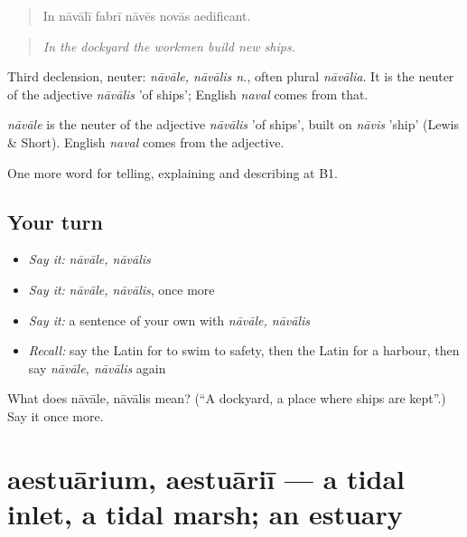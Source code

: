\begin{quote}
In nāvālī fabrī nāvēs novās aedificant.
\end{quote}

\begin{quote}
\emph{In the dockyard the workmen build new ships.}
\end{quote}

Third declension, neuter: \emph{nāvāle, nāvālis n.}, often plural \emph{nāvālia}. It is the neuter of the adjective \emph{nāvālis} 'of ships'; English \emph{naval} comes from that.

\begin{cousinweb}
\emph{nāvāle} is the neuter of the adjective \emph{nāvālis} 'of ships', built on \emph{nāvis} 'ship' (Lewis \& Short). English \emph{naval} comes from the adjective.
\end{cousinweb}

\begin{grammarlens}[title={What you've built}]
One more word for telling, explaining and describing at B1.
\end{grammarlens}

\subsection*{Your turn}
\begin{itemize}
\raggedright
  \item \emph{Say it:} \emph{nāvāle, nāvālis}
  \item \emph{Say it:} \emph{nāvāle, nāvālis}, once more
  \item \emph{Say it:} a sentence of your own with \emph{nāvāle, nāvālis}
  \item \emph{Recall:} say the Latin for to swim to safety, then the Latin for a harbour, then say \emph{nāvāle, nāvālis} again
\end{itemize}

\begin{tcolorbox}[breakable,colback=teal!4,colframe=teal!35!black,title={Before you move on}]
What does nāvāle, nāvālis mean? (\textquotedblleft{}A dockyard, a place where ships are kept\textquotedblright{}.) Say it once more.
\end{tcolorbox}
\section[aestuārium, aestuāriī]{aestuārium, aestuāriī — a tidal inlet, a tidal marsh; an estuary}


